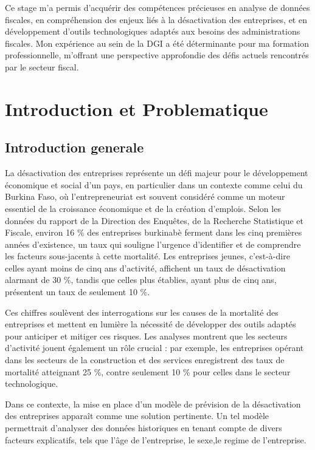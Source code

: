 \documentclass[a4paper,12pt]{report}
\begin{document}
Ce stage m'a permis d'acquérir des compétences précieuses en analyse de données fiscales, en compréhension des enjeux liés à la désactivation des entreprises, et en développement d'outils technologiques adaptés aux besoins des administrations fiscales. Mon expérience au sein de la DGI a été déterminante pour ma formation professionnelle, m'offrant une perspective approfondie des défis actuels rencontrés par le secteur fiscal.

\chapter{Introduction et Problematique}
\setcounter{section}{0}
\section{Introduction generale}
La désactivation des entreprises représente un défi majeur pour le développement économique et social d'un pays, en particulier dans un contexte comme celui du Burkina Faso, où l'entrepreneuriat est souvent considéré comme un moteur essentiel de la croissance économique et de la création d'emplois. Selon les données du rapport de la Direction des Enquêtes, de la Recherche Statistique et Fiscale, environ 16 \% des entreprises burkinabè ferment dans les cinq premières années d'existence, un taux qui souligne l'urgence d'identifier et de comprendre les facteurs sous-jacents à cette mortalité. Les entreprises jeunes, c'est-à-dire celles ayant moins de cinq ans d'activité, affichent un taux de désactivation alarmant de 30 \%, tandis que celles plus établies, ayant plus de cinq ans, présentent un taux de seulement 10 \%.

Ces chiffres soulèvent des interrogations sur les causes de la mortalité des entreprises et mettent en lumière la nécessité de développer des outils adaptés pour anticiper et mitiger ces risques. Les analyses montrent que les secteurs d'activité jouent également un rôle crucial : par exemple, les entreprises opérant dans les secteurs de la construction et des services enregistrent des taux de mortalité atteignant 25 \%, contre seulement 10 \% pour celles dans le secteur technologique.

Dans ce contexte, la mise en place d'un modèle de prévision de la désactivation des entreprises apparaît comme une solution pertinente. Un tel modèle permettrait d'analyser des données historiques en tenant compte de divers facteurs explicatifs, tels que l'âge de l'entreprise, le sexe,le regime de l'entreprise.
\end{document}
